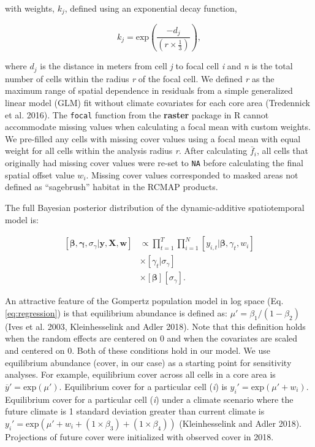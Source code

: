 \documentclass[
  12pt,
]{article}
\begin{document}
\noindent{}with weights, \(k_{j}\), defined using an exponential decay function,

\begin{equation}
k_{j} = \text{exp}\left( \frac{-d_{j} }{\left(r\times\frac{1}{3} \right)} \right),
\end{equation}

\noindent{}where \(d_j\) is the distance in meters from cell \emph{j} to focal cell \emph{i} and \emph{n} is the total number of cells within the radius \emph{r} of the focal cell.
We defined \emph{r} as the maximum range of spatial dependence in residuals from a simple generalized linear model (GLM) fit without climate covariates for each core area (Tredennick et al. 2016).
The \texttt{focal} function from the \textbf{raster} package in R cannot accommodate missing values when calculating a focal mean with custom weights.
We pre-filled any cells with missing cover values using a focal mean with equal weight for all cells within the analysis radius \emph{r}.
After calculating \(\bar{f}_{i}\), all cells that originally had missing cover values were re-set to \texttt{NA} before calculating the final spatial offset value \(w_i\).
Missing cover values corresponded to masked areas not defined as ``sagebrush'' habitat in the RCMAP products.

The full Bayesian posterior distribution of the dynamic-additive spatiotemporal model is:

\begin{align}
\left[\bm{\beta}, \bm{\gamma}, \sigma_{\gamma} | \textbf{y}, \textbf{X}, \textbf{w} \right] &\propto  \prod^T_{t=1} \prod^N_{i=1} \left[ y_{i,t}| \bm{\beta}, \gamma_t, w_i \right] \nonumber \\
&\times \left[ \gamma_t | \sigma_{\gamma} \right] \nonumber  \\
&\times \left[\bm{\beta}  \right] \left[ \sigma_{\gamma}\right].
\end{align}

An attractive feature of the Gompertz population model in log space (Eq. \ref{eq:regression}) is that equilibrium abundance is defined as: \(\mu' = \beta_1 / \left(1 - \beta_2 \right)\) (Ives et al. 2003, Kleinhesselink and Adler 2018).
Note that this definition holds when the random effects are centered on 0 and when the covariates are scaled and centered on 0.
Both of these conditions hold in our model.
We use equilibrium abundance (cover, in our case) as a starting point for sensitivity analyses.
For example, equilibrium cover across all cells in a core area is \(\overline{y}' = \text{exp}(\mu')\).
Equilibrium cover for a particular cell (\emph{i}) is \(y_i' = \text{exp}(\mu' + w_i)\).
Equilibrium cover for a particular cell (\emph{i}) under a climate scenario where the future climate is 1 standard deviation greater than current climate is \(y_i' = \text{exp}\left(\mu' + w_i + (1\times\beta_3) + (1\times\beta_4) \right)\) (Kleinhesselink and Adler 2018).
Projections of future cover were initialized with observed cover in 2018.
\end{document}
